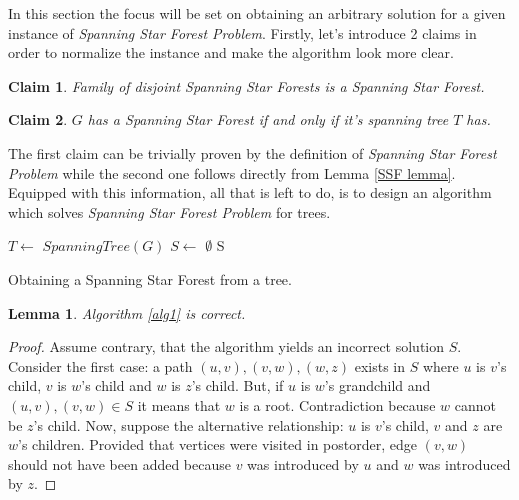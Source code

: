 \documentclass[en]{pracamgr}
\newtheorem{lemma}{Lemma}
\newtheorem{claim}{Claim}
\begin{document}
In this section the focus will be set on obtaining an arbitrary solution for
a given instance of \emph{Spanning Star Forest Problem}. Firstly, let's
introduce 2 claims in order to normalize the instance and make the algorithm
look more clear.

\begin{claim} \label{SSF sum}
	Family of disjoint Spanning Star Forests is a Spanning Star Forest.
\end{claim}

\begin{claim} \label{Spanning tree SSF}
	$G$ has a Spanning Star Forest if and only if it's spanning tree $T$ has.
\end{claim}

The first claim can be trivially proven by the definition of 
\emph{Spanning Star Forest Problem} while the second one follows directly from
Lemma \ref{SSF lemma}. Equipped with this information, all that is left to do,
is to design an algorithm which solves \emph{Spanning Star Forest Problem} for 
trees.

\begin{algorithm}\label{alg1}
	$T \leftarrow$ $SpanningTree(G)$\;
	$S \leftarrow$ $\emptyset$\;
	\Return S
	\caption{Obtaining a Spanning Star Forest from a tree.}
\end{algorithm}

\begin{lemma}\label{alg1 correctness}
	Algorithm \ref{alg1} is correct.
\end{lemma}

\begin{proof}
	Assume contrary, that the algorithm yields an incorrect solution $S$. Consider
	the first case: a path $(u,v),(v,w),(w,z)$ exists in $S$ where $u$ is $v$'s 
	child, $v$ is $w$'s child and $w$ is $z$'s child. But, if $u$ is $w$'s
	grandchild and $(u,v),(v,w) \in S$ it means that $w$ is a root. Contradiction
	because	$w$ cannot be $z$'s child.
	Now, suppose the alternative relationship: $u$ is $v$'s child, $v$ and $z$ are
	$w$'s children. Provided that vertices were visited in postorder, edge $(v,w)$
	should not have been added because $v$ was introduced by $u$ and $w$ was
	introduced by $z$.
\end{proof}
\end{document}

